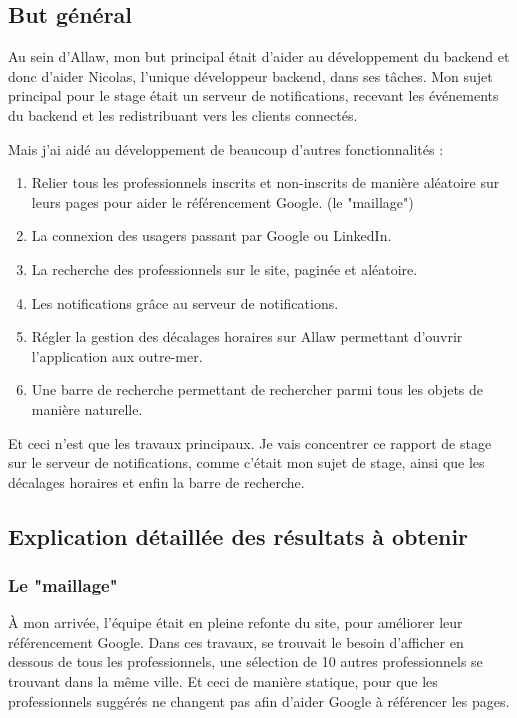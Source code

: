 
\subsection{But général}

Au sein d'Allaw, mon but principal était d'aider au développement du backend
et donc d'aider Nicolas, l'unique développeur backend, dans ses tâches. Mon
sujet principal pour le stage était un serveur de notifications, recevant les
événements du backend et les redistribuant vers les clients connectés.

Mais j'ai aidé au développement de beaucoup d'autres fonctionnalités :

\begin{enumerate}
    \item Relier tous les professionnels inscrits et non-inscrits de manière aléatoire sur
          leurs pages pour aider le référencement Google. (le "maillage")
	\item La connexion des usagers passant par Google ou LinkedIn.
    \item La recherche des professionnels sur le site, paginée et aléatoire.
	\item Les notifications grâce au serveur de notifications.
	\item Régler la gestion des décalages horaires sur Allaw permettant d'ouvrir l'application aux outre-mer.
	\item Une barre de recherche permettant de rechercher parmi tous les objets de manière naturelle.
\end{enumerate}

Et ceci n'est que les travaux principaux. Je vais concentrer ce rapport de stage
sur le serveur de notifications, comme c'était mon sujet de stage, ainsi que les
décalages horaires et enfin la barre de recherche.

\subsection{Explication détaillée des résultats à obtenir}

\subsubsection{Le "maillage"}

À mon arrivée, l'équipe était en pleine refonte du site, pour améliorer leur
référencement Google. Dans ces travaux, se trouvait le besoin d'afficher en
dessous de tous les professionnels, une sélection de 10 autres professionnels
se trouvant dans la même ville. Et ceci de manière statique, pour que les
professionnels suggérés ne changent pas afin d'aider Google à référencer les
pages.

